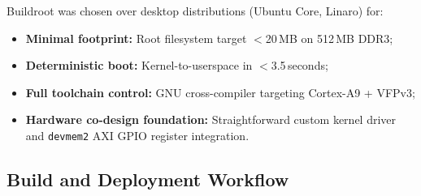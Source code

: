 \documentclass[12pt,a4paper]{article}
\begin{document}
Buildroot was chosen over desktop distributions (Ubuntu Core, Linaro) for:
\begin{itemize}
  \item \textbf{Minimal footprint:} Root filesystem target $<$20\,MB on 512\,MB DDR3;
  \item \textbf{Deterministic boot:} Kernel-to-userspace in $<$3.5\,seconds;
  \item \textbf{Full toolchain control:} GNU cross-compiler targeting Cortex-A9 + VFPv3;
  \item \textbf{Hardware co-design foundation:} Straightforward custom kernel driver and
  \texttt{devmem2} AXI GPIO register integration.
\end{itemize}

\subsection{Build and Deployment Workflow}
\end{document}

